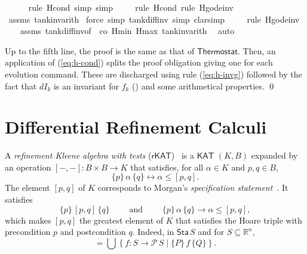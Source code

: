 \documentclass[envcountsame,envcountsect]{llncs}
\newcommand{\KAT}{\mathsf{KAT}}
\newcommand{\rKAT}{\mathsf{rKAT}}
\newcommand{\Pow}{\mathcal{P}}
\newcommand{\reals}{\mathbb{R}}
\newcommand{\sta}{\mathsf{Sta}}
\begin{document}
\begin{example}
\begin{isabellebody}
\ \ \ \ \ \isamarkupfalse%
{\isacharparenleft}rule\ H{\isacharunderscore}cond{\isacharcomma}\ simp{\isacharcomma}\ simp{\isacharparenright}{\isacharplus}\isanewline
\ \ \ \ \isamarkupfalse%
{\isacharparenleft}rule\ H{\isacharunderscore}cond{\isacharcomma}\ rule\ H{\isacharunderscore}g{\isacharunderscore}ode{\isacharunderscore}inv{\isacharparenright}\isanewline
\ \ \isamarkupfalse%
\ assms\ tank{\isacharunderscore}inv{\isacharunderscore}arith{}\ \isamarkupfalse%
{\isacharparenleft}force\ simp{\isacharcolon}\ tank{\isacharunderscore}diff{\isacharunderscore}inv{\isacharcomma}\ simp{\isacharcomma}\ clarsimp{\isacharparenright}\isanewline
\ \ \ \ \isamarkupfalse%
{\isacharparenleft}rule\ H{\isacharunderscore}g{\isacharunderscore}ode{\isacharunderscore}inv{\isacharparenright}\isanewline
\ \ \isamarkupfalse%
\ assms\ tank{\isacharunderscore}diff{\isacharunderscore}inv{\isacharbrackleft}of\ {\isacharunderscore}\ {\isachardoublequoteopen}{\isacharminus}c\isactrlsub o{\isachardoublequoteclose}\ Hmin\ Hmax{\isacharbrackright}\ tank{\isacharunderscore}inv{\isacharunderscore}arith{}\ \isamarkupfalse%
\ auto\isanewline
\end{isabellebody}

Up to the fifth line, the proof is the same as that of $\mathsf{Thermostat}$. Then, an application of (\ref{eq:h-cond}) splits the proof obligation giving one for each evolution command. These are discharged using rule (\ref{eq:h-invg}) followed by the fact that $dI_k$ is an invariant for $f_k$ () and some arithmetical properties. \qed
\end{example}


\section{Differential Refinement Calculi}\label{sec:refine}

A \emph{refinement Kleene algebra with tests}
($\rKAT$)~\cite{ArmstrongGS16}  is a $\KAT$
$(K,B)$ expanded by an operation $[-,-]:B\times B\to K$ that
satisfies, for all $\alpha \in K$ and $p,q\in B$, 
\begin{equation*}
  \{p\}\, \alpha\, \{q\} \leftrightarrow \alpha\le [p,q].
\end{equation*}
The element $[p,q]$ of $K$ corresponds to Morgan's \emph{specification
  statement}~\cite{Morgan94}. It satisfies
\begin{equation*}
  \{p\}\, [p,q]\, \{q\}\qquad \text{ and }\qquad \{p\}\, \alpha\, \{q\} \rightarrow \alpha\le [p,q],
\end{equation*}
which makes $[p,q]$ the greatest element of $K$ that satisfies the Hoare
triple with precondition $p$ and postcondition $q$.  Indeed, in
$\sta\, S$ and for $S\subseteq \reals^n$,
\begin{equation*}
  [P,Q] = \bigcup \left\{f:S\to \Pow\, S \mid \{P\}\, f\, \{Q\}\right\}.
\end{equation*}
\end{document}
